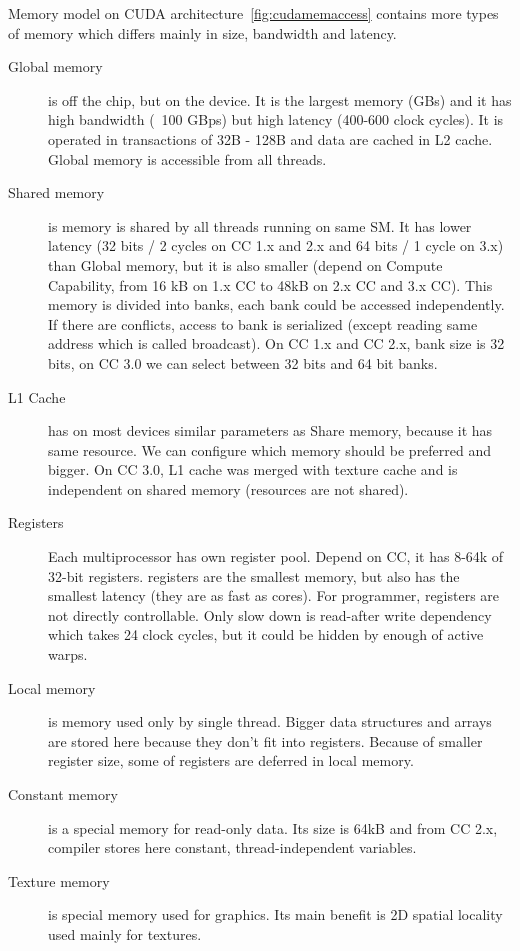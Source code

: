 Memory model on CUDA architecture~\autoref{fig:cudamemaccess} contains more types of memory which differs mainly in size, bandwidth and latency.
\begin{description}
\item[Global memory] is off the chip, but on the device. It is the largest memory (GBs) and it has high bandwidth (~100 GBps) but high latency (400-600 clock cycles). It is operated in transactions of 32B - 128B and data are cached in L2 cache. Global memory is accessible from all threads.
\item[Shared memory] is memory is shared by all threads running on same SM. It has lower latency (32 bits / 2 cycles on CC 1.x and 2.x and 64 bits / 1 cycle on 3.x) than Global memory, but it is also smaller (depend on Compute Capability, from 16 kB on 1.x CC to 48kB on 2.x CC and 3.x CC). This memory is divided into banks, each bank could be accessed independently. If there are conflicts, access to bank is serialized (except reading same address which is called broadcast). On CC 1.x and CC 2.x, bank size is 32 bits, on CC 3.0 we can select between 32 bits and 64 bit banks.
\item[L1 Cache] has on most devices similar parameters as Share memory, because it has same resource. We can configure which memory should be preferred and bigger. On CC 3.0, L1 cache was merged with texture cache and is independent on shared memory (resources are not shared).
\item[Registers] Each multiprocessor has own register pool. Depend on CC, it has 8-64k of 32-bit registers. registers are the smallest memory, but also has the smallest latency (they are as fast as cores). For programmer, registers are not directly controllable. Only slow down is read-after write dependency which takes 24 clock cycles, but it could be hidden by enough of active warps.
\item[Local memory] is memory used only by single thread. Bigger data structures and arrays are stored here because they don't fit into registers. Because of smaller register size, some of registers are deferred in local memory.
\item[Constant memory] is a special memory for read-only data. Its size is 64kB and from CC 2.x, compiler stores here constant, thread-independent variables.
\item[Texture memory] is special memory used for graphics. Its main benefit is 2D spatial locality used mainly for textures.
\end{description}

